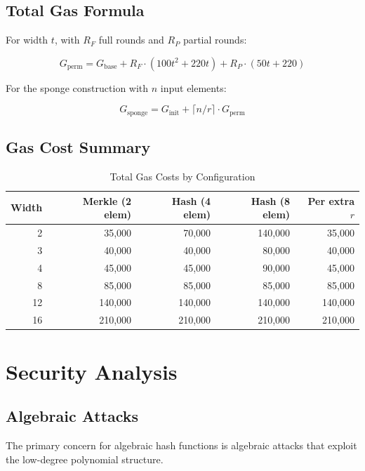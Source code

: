 \documentclass[11pt,a4paper]{article}
\begin{document}
\subsection{Total Gas Formula}

For width $t$, with $R_F$ full rounds and $R_P$ partial rounds:

\begin{equation}
G_{\text{perm}} = G_{\text{base}} + R_F \cdot (100t^2 + 220t) + R_P \cdot (50t + 220)
\end{equation}

For the sponge construction with $n$ input elements:

\begin{equation}
G_{\text{sponge}} = G_{\text{init}} + \lceil n/r \rceil \cdot G_{\text{perm}}
\end{equation}

\subsection{Gas Cost Summary}

\begin{table}[htbp]
\centering
\caption{Total Gas Costs by Configuration}
\label{tab:totalgas}
\begin{tabular}{@{}rrrrr@{}}
\toprule
Width & Merkle (2 elem) & Hash (4 elem) & Hash (8 elem) & Per extra $r$ \\
\midrule
2 & 35,000 & 70,000 & 140,000 & 35,000 \\
3 & 40,000 & 40,000 & 80,000 & 40,000 \\
4 & 45,000 & 45,000 & 90,000 & 45,000 \\
8 & 85,000 & 85,000 & 85,000 & 85,000 \\
12 & 140,000 & 140,000 & 140,000 & 140,000 \\
16 & 210,000 & 210,000 & 210,000 & 210,000 \\
\bottomrule
\end{tabular}
\end{table}

\section{Security Analysis}

\subsection{Algebraic Attacks}

The primary concern for algebraic hash functions is algebraic attacks that exploit the low-degree polynomial structure.
\end{document}
